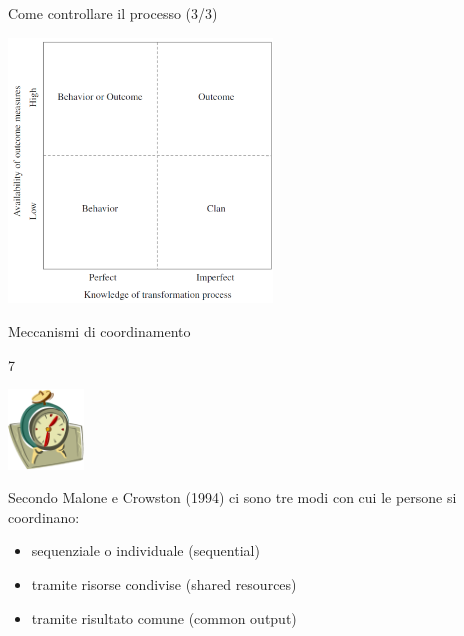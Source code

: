 \documentclass{beamer}
\begin{document}
\begin{frame}{\centerline{Come controllare il processo (3/3)}}


\begin{center}
\includegraphics[width=70mm]{P2023.AIBCCSS.IlConcettoDiSoftware/img-img03.png}
\end{center}
\end{frame}

\begin{frame}{\centerline{Meccanismi di coordinamento}}
7
\begin{center}
\includegraphics[width=20mm]{P2023.AIBCCSS.IlConcettoDiSoftware/img-img10.png}
\end{center}

Secondo Malone e Crowston (1994) ci sono tre modi con cui le persone si coordinano:
\begin{itemize}
\item  sequenziale o individuale (sequential)
\item  tramite risorse condivise (shared resources)
\item  tramite risultato comune (common output)
\end{itemize}

\end{frame}
\end{document}
